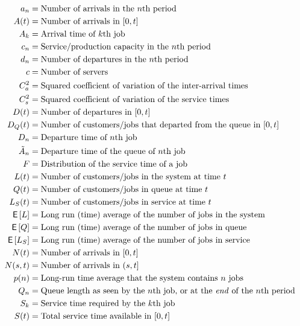 \begin{align*}
  a_n &= \text{Number of arrivals in the $n$th period} \\
  A(t) &= \text{Number of arrivals in $[0,t]$} \\
  A_k &= \text{Arrival time of $k$th job} \\
  c_n &= \text{Service/production capacity in the $n$th period} \\
  d_n &= \text{Number of departures in the $n$th period} \\
  c &= \text{Number of servers} \\
  C_a^2 &= \text{Squared coefficient of variation of the inter-arrival times} \\
  C_s^2 &= \text{Squared coefficient of variation of the service times} \\
  D(t) &= \text{Number of departures in $[0,t]$} \\
  D_Q(t) &= \text{Number of customers/jobs that departed from the queue in $[0,t]$} \\
  D_n &= \text{Departure time of $n$th job} \\
  \tilde A_{n} &= \text{Departure time of the queue of $n$th job} \\
  F &= \text{Distribution of the service time of a job} \\
  L(t) &= \text{Number of customers/jobs in the system at time $t$} \\
  Q(t) &= \text{Number of customers/jobs in queue at time $t$} \\
  L_S(t) &= \text{Number of customers/jobs in service at time $t$} \\
  \E L &= \text{Long run (time) average of the number of jobs in the system} \\
  \E Q &= \text{Long run (time) average of the number of jobs in queue} \\
  \E{L_S} &= \text{Long run (time) average of the number of jobs in service} \\
  N(t) &= \text{Number of arrivals in $[0,t]$} \\
  N(s,t) &= \text{Number of arrivals in $(s,t]$} \\
  p(n)  &= \text{Long-run time average that the system contains $n$ jobs} \\
  Q_n &= \text{Queue length as seen by the $n$th job, or at the \textit{end} of the $n$th period} \\
  S_k &= \text{Service time required by the $k$th job} \\
  S(t) &= \text{Total service time available in $[0,t]$} \\

\end{align*}
